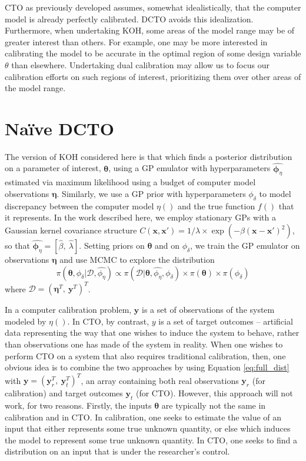 \documentclass[12pt]{article}
\begin{document}
CTO as previously developed assumes, somewhat idealistically, that the computer model is already perfectly calibrated.
%
DCTO avoids this idealization.
%
Furthermore, when undertaking KOH, some areas of the model range may be of greater interest than others.
%
For example, one may be more interested in calibrating the model to be accurate in the optimal region of some design variable $\theta$ than elsewhere.
%
Undertaking dual calibration may allow us to focus our calibration efforts on such regions of interest, prioritizing them over other areas of the model range.
%

%
\section{Na\"ive DCTO}
%
The version of KOH considered here is that which finds a posterior distribution on a parameter of interest, $\boldsymbol\theta$, using a GP emulator with hyperparameters $\widehat{\boldsymbol\phi_\eta}$ estimated via maximum likelihood using a budget of computer model observations $\boldsymbol\eta$. 
%
Similarly, we use a GP prior with hyperparameters $\phi_\delta$ to model discrepancy between the computer model $\eta()$ and the true function $f()$ that it represents.
%
In the work described here, we employ stationary GPs with a Gaussian kernel covariance structure $C(\mathbf x,\mathbf x') = 1/\lambda \times \exp(-\beta(\mathbf x-\mathbf x')^2)$, so that $\widehat {\boldsymbol\phi_\eta} = \left[\widehat \beta,\ \widehat \lambda\right]$.
%
Setting priors on $\boldsymbol\theta$ and on $\phi_\delta$, we train the GP emulator on observations $\boldsymbol \eta$ and use MCMC to explore the distribution
\begin{equation} \label{eq:full_dist}
\pi(\boldsymbol \theta,\phi_\delta|\mathcal D,\widehat{\phi_\eta})
\propto \pi(\mathcal D | \boldsymbol \theta,\widehat{\phi_\eta}, \phi_\delta) %
\times \pi(\boldsymbol\theta)
\times \pi(\phi_\delta)
\end{equation}
%
where $\mathcal D = (\boldsymbol\eta^T,\ \mathbf y^T)^T$.
%

%
In a computer calibration problem, $\mathbf y$ is a set of observations of the system modeled by $\eta()$.
%
In CTO, by contrast, $y$ is a set of target outcomes -- artificial data representing the way that one wishes to induce the system to behave, rather than observations one has made of the system in reality.
%
When one wishes to perform CTO on a system that also requires traditional calibration, then, one obvious idea is to combine the two approaches by using Equation \eqref{eq:full_dist} with $\mathbf y= (\mathbf y_r^T,\ \mathbf y_t^T)^T$, an array containing both real observations $\mathbf y_r$ (for calibration) and target outcomes $\mathbf y_t$ (for CTO).
%
However, this approach will not work, for two reasons.
%
Firstly, the inputs $\boldsymbol\theta$ are typically not the same in calibration and in CTO.
%
In calibration, one seeks to estimate the value of an input that either represents some true unknown quantity, or else which induces the model to represent some true unknown quantity.
%
In CTO, one seeks to find a distribution on an input that is under the researcher's control.
%
\end{document}
